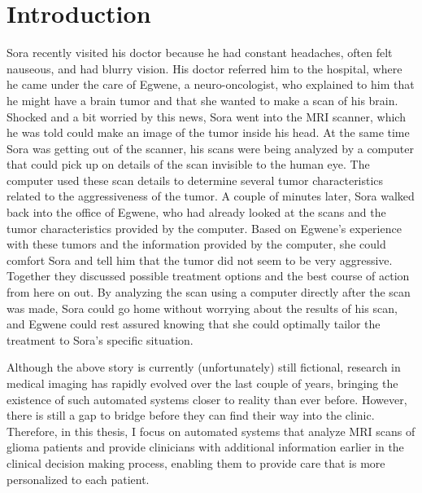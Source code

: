 
\chapter{Introduction}\label{chap:introduction}

\begin{ChapterAbstractNoTitle}
Sora recently visited his doctor because he had constant headaches, often felt nauseous, and had blurry vision.
His doctor referred him to the hospital, where he came under the care of Egwene, a neuro-oncologist, who explained to him that he might have a brain \gls{tumor} and that she wanted to make a scan of his brain.
Shocked and a bit worried by this news, Sora went into the MRI scanner, which he was told could make an image of the \gls{tumor} inside his head.
At the same time Sora was getting out of the scanner, his scans were being analyzed by a computer that could pick up on details of the scan invisible to the human eye.
The computer used these scan details to determine several \gls{tumor} characteristics related to the aggressiveness of the \gls{tumor}.
A couple of minutes later, Sora walked back into the office of Egwene, who had already looked at the scans and the \gls{tumor} characteristics provided by the computer.
Based on Egwene's experience with these \glspl{tumor} and the information provided by the computer, she could comfort Sora and tell him that the \gls{tumor} did not seem to be very aggressive.
Together they discussed possible treatment options and the best course of action from here on out.
By analyzing the scan using a computer directly after the scan was made, Sora could go home without worrying about the results of his scan, and Egwene could rest assured knowing that she could optimally tailor the treatment to Sora's specific situation.
\end{ChapterAbstractNoTitle}

Although the above story is currently (unfortunately) still fictional, research in medical imaging has rapidly evolved over the last couple of years, bringing the existence of such automated systems closer to reality than ever before.
However, there is still a gap to bridge before they can find their way into the clinic.
Therefore, in this thesis, I focus on automated systems that analyze \acrshort{MRI} scans of glioma patients and provide clinicians with additional information earlier in the clinical decision making process, enabling them to provide care that is more personalized to each patient.

